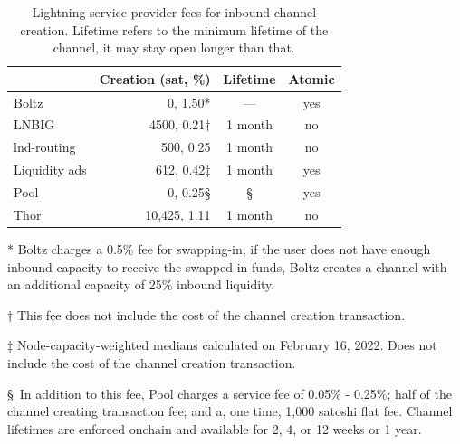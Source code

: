 \documentclass[10pt,twocolumn]{article}
\begin{document}
\begin{table}[tb] \footnotesize
\caption[Channel creation]{\label{tbl:inbound}
	Lightning service provider fees for inbound channel creation.
	Lifetime refers to the minimum lifetime of the channel,
	it may stay open longer than that.
}
\centering
\begin{tabular}{lrcc}
\toprule
	& {Creation (sat, \%)} & {Lifetime} & Atomic\\
\midrule
Boltz	& 0, 1.50*	& --- & yes \\
LNBIG	& 4500, 0.21$\dagger$	& 1 month & no \\
lnd-routing	& 500, 0.25\phantom{*}	& 1 month & no \\
Liquidity ads	& 612, 0.42$\ddagger$	& 1 month & yes \\
Pool	& 0, 0.25\S	& \S & yes \\
Thor	& 10,425, 1.11\phantom{*}	& 1 month & no \\
\bottomrule
\end{tabular}
\begin{flushleft}

	* Boltz charges a 0.5\% fee for swapping-in,
	if the user does not have enough inbound capacity to receive
	the swapped-in funds, Boltz creates a channel with
	an additional capacity of 25\% inbound liquidity.

	$\dagger$ This fee does not include the cost of the
	channel creation transaction.


	$\ddagger$ Node-capacity-weighted medians calculated on
	February 16, 2022.  Does not include the cost of the
	channel creation transaction.

	\S\, In addition to this fee, Pool charges a service fee of 0.05\% - 0.25\%;
	half of the channel creating transaction fee;
	and a, one time, 1,000 satoshi flat fee.
	Channel lifetimes are enforced onchain and available for
	2, 4, or 12 weeks or 1 year.

\end{flushleft}
\end{table}
\end{document}
